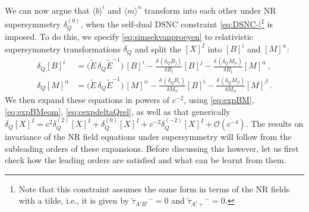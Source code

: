 \documentclass[a4paper,10pt,openany]{article}
\begin{document}
	We can now argue that $\langle b \rangle^i$ and $\langle m \rangle^\alpha$ transform into each other under NR supersymmetry $\delta_Q^{(0)}$, when the self-dual DSNC constraint \eqref{eq:DSNC-}\footnote{Note that this constraint assumes the same form in terms of the NR fields with a tilde, i.e., it is given by $\tilde{\tau}_{A'B'}{}^- = 0$ and $\tilde{\tau}_{A'+}{}^- = 0$.} is imposed. To do this, we specify \eqref{eq:simsekvanproeyen} to relativistic supersymmetry transformations $\delta_Q$ and split the $[X]^I$ into $[B]^i$ and $[M]^\alpha$:
	\begin{align} \label{eq:simsekvanproeyen2}
		\delta_Q [B]^i &= \big(\tilde{E}\,\delta_Q \tilde{E}^{-1}\big)\,[B]^i - \frac{\delta\,(\delta_Q B_j)}{\delta B_i} [B]^j - \frac{\delta\,(\delta_Q M_\alpha)}{\delta B_i} [M]^\alpha \,, \nonumber \\
		\delta_Q [M]^\alpha &= \big(\tilde{E}\,\delta_Q \tilde{E}^{-1}\big)\,[M]^\alpha - \frac{\delta\,(\delta_Q B_i)}{\delta M_\alpha} [B]^i - \frac{\delta\,(\delta_Q M_\beta)}{\delta M_\alpha} [M]^\beta \,.
	\end{align}
	We then expand these equations in powers of $c^{-2}$, using \eqref{eq:expBM}, \eqref{eq:expBMeom}, \eqref{eq:cexpdeltaQrel}, as well as that generically $\delta_Q [X]^I = c^2 \delta_Q^{(2)} [X]^I + \delta_Q^{(0)} [X]^I + c^{-2} \delta_Q^{(-2)} [X]^I + \mathcal{O}(c^{-4})$. The results on invariance of the NR field equations under supersymmetry will follow from the subleading orders of these expansions. Before discussing this however, let us first check how the leading orders are satisfied and what can be learnt from them.
	
\end{document}
